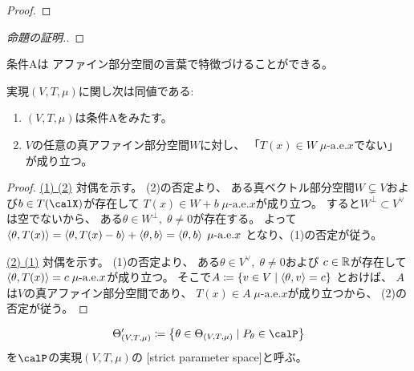 \documentclass[report]{jlreq}
\begin{document}
\begin{proof}
    \TODO{}
\end{proof}

\begin{proof}[命題の証明.]
    \TODO{}
\end{proof}

条件Aは
アファイン部分空間の言葉で特徴づけることができる。

\begin{proposition}
    実現$(V, T, \mu)$に関し次は同値である:
    \begin{enumerate}
        \item $(V, T, \mu)$は条件Aをみたす。
        \item $V$の任意の真アファイン部分空間$W$に対し、
            「$T(x) \in W \; \text{$\mu$-a.e.$x$}$でない」
            が成り立つ。
    \end{enumerate}
\end{proposition}

\begin{proof}
    \uline{(1) \Rightarrow (2)} \quad
    対偶を示す。
    (2)の否定より、
    ある真ベクトル部分空間$W \subsetneq V$および$b \in T(\calX)$が存在して
    $T(x) \in W + b \; \text{$\mu$-a.e.$x$}$が成り立つ。
    すると$W^\perp \subset V^\vee$は空でないから、
    ある$\theta \in W^\perp, \; \theta \neq 0$が存在する。
    よって
    $\left\langle{\theta},{T(x)}\right\rangle
        = \left\langle{\theta},{T(x) - b}\right\rangle
        + \left\langle{\theta},{b}\right\rangle
        = \left\langle{\theta},{b}\right\rangle \; \text{$\mu$-a.e.$x$}$
    となり、(1)の否定が従う。

    \uline{(2) \Rightarrow (1)} \quad
    対偶を示す。
    (1)の否定より、
    ある$\theta \in V^\vee, \; \theta \neq 0$および
    $c \in \mathbb{R}$が存在して
    $\left\langle{\theta},{T(x)}\right\rangle = c \; \text{$\mu$-a.e.$x$}$が成り立つ。
    そこで$A \coloneqq \left\{{
        v \in V
        \mid
        \left\langle{\theta},{v}\right\rangle = c
    }\right\}$
    とおけば、
    $A$は$V$の真アファイン部分空間であり、
    $T(x) \in A \; \text{$\mu$-a.e.$x$}$が成り立つから、
    (2)の否定が従う。
\end{proof}

\begin{definition}
    \begin{equation}
        \Theta'_{(V, T, \mu)} \coloneqq \mybrace{
            \theta \in \Theta_{(V, T, \mu)}
            \mid
            P_\theta \in \calP
        }
    \end{equation}
    を$\calP$の実現$(V, T, \mu)$の
    [strict parameter space]と呼ぶ。
\end{definition}
\end{document}
